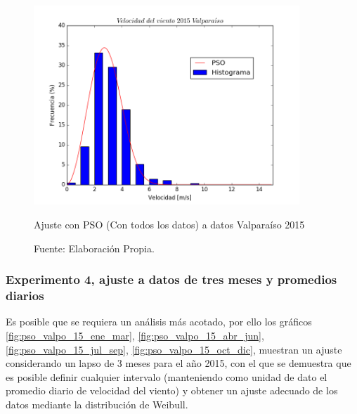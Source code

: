 \begin{figure}[H]
    \centering
    \includegraphics[height=75mm]{figures/result_2015_fit_all_data.png}
    \caption{Ajuste con PSO (Con todos los datos) a datos Valparaíso 2015}
    \vspace{-.25cm}
    \caption*{Fuente: Elaboración Propia.}
    \label{fig:pso_valpo_15_all_data}
\end{figure}

\subsubsection{Experimento 4, ajuste a datos de tres meses y promedios diarios}
Es posible que se requiera un análisis más acotado, por ello los gráficos \ref{fig:pso_valpo_15_ene_mar}, \ref{fig:pso_valpo_15_abr_jun}, 
\ref{fig:pso_valpo_15_jul_sep}, \ref{fig:pso_valpo_15_oct_dic}, muestran un ajuste considerando un lapso de 3 meses para el año 2015, con el
que se demuestra que es posible definir cualquier intervalo (manteniendo como unidad de dato el promedio diario de velocidad del viento)
 y obtener un ajuste adecuado de los datos mediante la distribución de Weibull.

